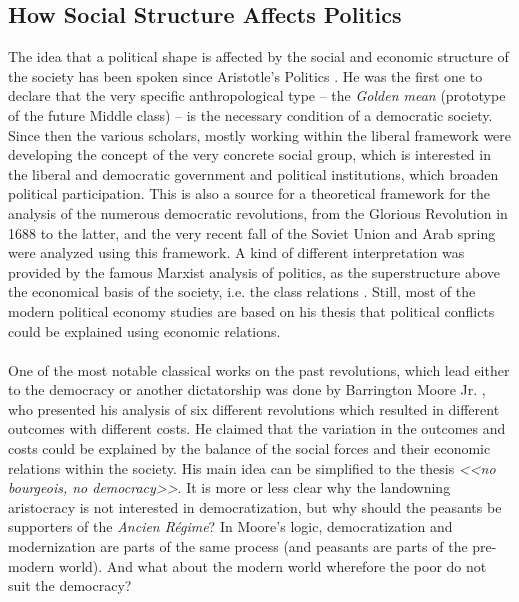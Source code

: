 \documentclass[a4paper, 12pt]{article}
\begin{document}
	\subsection{How Social Structure Affects Politics}
	
	The idea that a political shape is affected by the social and economic structure of the society has been spoken since Aristotle's Politics \parencite{aristotle}. He was the first one to declare that the very specific anthropological type -- the \textit{Golden mean} (prototype of the future Middle class) -- is the necessary condition of a democratic society. Since then the various scholars, mostly working within the liberal framework were developing the concept of the very concrete social group, which is interested in the liberal and democratic government and political institutions, which broaden political participation. This is also a source for a theoretical framework for the analysis of the numerous democratic revolutions, from the Glorious Revolution in 1688 to the latter, and the very recent fall of the Soviet Union and Arab spring were analyzed using this framework. A kind of different interpretation was provided by the famous Marxist analysis of politics, as the superstructure above the economical basis of the society, i.e. the class relations \parencite{marx}. Still, most of the modern political economy studies are based on his thesis that political conflicts could be explained using economic relations.
	\\\\
	One of the most notable classical works on the past revolutions, which lead either to the democracy or another dictatorship was done by Barrington Moore Jr. \parencite{social_origins}, who presented his analysis of six different revolutions which resulted in different outcomes with different costs. He claimed that the variation in the outcomes and costs could be explained by the balance of the social forces and their economic relations within the society. His main idea can be simplified to the thesis \textit{<<no bourgeois, no democracy>>}. It is more or less clear why the landowning aristocracy is not interested in democratization, but why should the peasants be supporters of the \textit{Ancien Régime}? In Moore's logic, democratization and modernization are parts of the same process (and peasants are parts of the pre-modern world). And what about the modern world wherefore the poor do not suit the democracy? 
	\\\\
\end{document}
